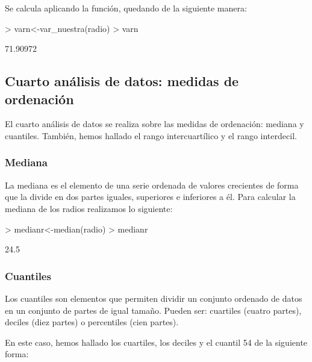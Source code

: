 \documentclass [a4paper] {article}
\begin{document}
Se calcula aplicando la función, quedando de la siguiente manera:
\begin{Schunk}
\begin{Sinput}
> varn<-var_nuestra(radio)
> varn
\end{Sinput}
\begin{Soutput}
[1] 71.90972
\end{Soutput}
\end{Schunk}


\subsection{Cuarto análisis de datos: medidas de ordenación}
El cuarto análisis de datos se realiza sobre las medidas de ordenación: mediana y  cuantiles. También, hemos hallado
el rango intercuartílico y el rango interdecil.

\subsubsection{Mediana}
La mediana es el elemento de una serie ordenada de valores crecientes de forma que la divide en dos partes iguales,
superiores e inferiores a él. Para calcular la mediana de los radios realizamos lo siguiente:

\begin{Schunk}
\begin{Sinput}
> medianr<-median(radio)
> medianr
\end{Sinput}
\begin{Soutput}
[1] 24.5
\end{Soutput}
\end{Schunk}

\subsubsection{Cuantiles}
Los cuantiles son elementos que permiten dividir un conjunto ordenado de datos en un conjunto de partes de igual tamaño.
Pueden ser: cuartiles (cuatro partes), deciles (diez partes) o percentiles (cien partes).

En este caso, hemos hallado los cuartiles, los deciles y el cuantil 54 de la siguiente forma:
\end{document}
